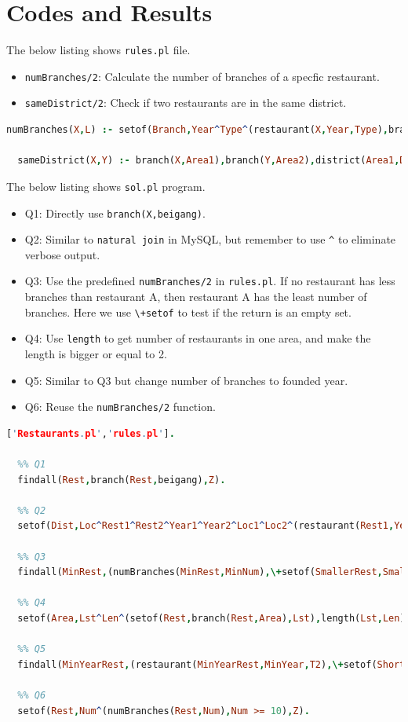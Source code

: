 ﻿\documentclass[a4paper, 11pt]{article}
\begin{document}
\section{Codes and Results}
The below listing shows \verb'rules.pl' file.
\begin{itemize}
  \item \verb'numBranches/2': Calculate the number of branches of a specfic restaurant.
  \item \verb'sameDistrict/2': Check if two restaurants are in the same district.
\end{itemize}
\begin{lstlisting}[language=prolog]
  numBranches(X,L) :- setof(Branch,Year^Type^(restaurant(X,Year,Type),branch(X,Branch)),Z),length(Z,L).

  sameDistrict(X,Y) :- branch(X,Area1),branch(Y,Area2),district(Area1,Dist),district(Area2,Dist).
\end{lstlisting}

The below listing shows \verb'sol.pl' program.
\begin{itemize}
  \item Q1: Directly use \verb'branch(X,beigang)'.
  \item Q2: Similar to \verb'natural join' in MySQL, but remember to use \verb'^' to eliminate verbose output.
  \item Q3: Use the predefined \verb'numBranches/2' in \verb'rules.pl'. If no restaurant has less branches than restaurant A, then restaurant A has the least number of branches. Here we use \verb'\+setof' to test if the return is an empty set.
  \item Q4: Use \verb'length' to get number of restaurants in one area, and make the length is bigger or equal to 2.
  \item Q5: Similar to Q3 but change number of branches to founded year.
  \item Q6: Reuse the \verb'numBranches/2' function.
\end{itemize}
\begin{lstlisting}[language=prolog]
  ['Restaurants.pl','rules.pl'].

  %% Q1
  findall(Rest,branch(Rest,beigang),Z).

  %% Q2
  setof(Dist,Loc^Rest1^Rest2^Year1^Year2^Loc1^Loc2^(restaurant(Rest1,Year1,yuecai),restaurant(Rest2,Year2,xiangcai),branch(Rest1,Loc1),branch(Rest2,Loc2),district(Loc1,Dist),district(Loc2,Dist)),Res).

  %% Q3
  findall(MinRest,(numBranches(MinRest,MinNum),\+setof(SmallerRest,SmallerNum^(numBranches(SmallerRest,SmallerNum),MinNum > SmallerNum),Lst)),Z).

  %% Q4
  setof(Area,Lst^Len^(setof(Rest,branch(Rest,Area),Lst),length(Lst,Len),Len >= 2),Z).

  %% Q5
  findall(MinYearRest,(restaurant(MinYearRest,MinYear,T2),\+setof(ShorterRest,T1^Year^(restaurant(ShorterRest,Year,T1),Year < MinYear),Lst)),Z).

  %% Q6
  setof(Rest,Num^(numBranches(Rest,Num),Num >= 10),Z).
\end{lstlisting}
\end{document}
